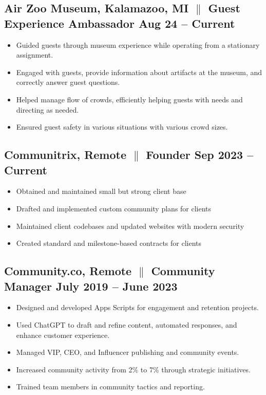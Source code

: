 \documentclass[a4paper,10pt]{article}
\begin{document}
\subsection{Air Zoo Museum, Kalamazoo, MI {$\parallel$}{
                  Guest Experience Ambassador} \hfill
      \textbf{Aug 24 – Current}}
\begin{itemize}
      \item Guided guests through museum experience while operating from a stationary assignment.
      \item Engaged with guests, provide information about artifacts at the museum,
            and correctly answer guest questions.
      \item Helped manage flow of crowds, efficiently helping guests with needs and
            directing as needed.
      \item Ensured guest safety in various situations with various crowd sizes.
\end{itemize}

\subsection{Communitrix, Remote {$\parallel$}{ Founder} \hfill
      \textbf{Sep 2023 – Current}}
\begin{itemize}
      \item Obtained and maintained small but strong client base
      \item Drafted and implemented custom community plans for clients
      \item Maintained client codebases and updated websites with modern security
      \item Created standard and milestone-based contracts for clients
\end{itemize}

\subsection{Community.co, Remote {$\parallel$}{ Community Manager} \hfill
      \textbf{July 2019 – June
            2023}}
\begin{itemize}
      \item Designed and developed Apps Scripts for engagement and retention
            projects.
      \item Used ChatGPT to draft and refine content, automated responses, and
            enhance customer experience.
      \item Managed VIP, CEO, and Influencer publishing and community
            events.
      \item Increased community activity from 2\% to 7\% through
            strategic
            initiatives.
      \item Trained team members in community tactics and reporting.
\end{itemize}
\end{document}
